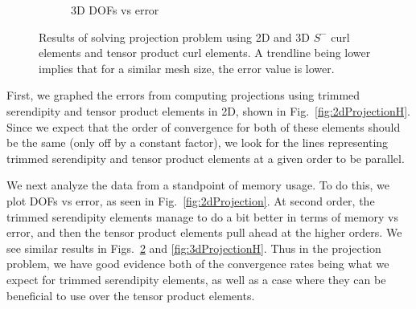 \documentclass[manuscript,screen]{acmart}
\newcommand\josh[1]{\textbf{\textcolor[rgb]{0,.5,1}{[Josh: #1]}}}
\begin{document}
\begin{figure}[h]
\begin{subfigure}[h]{0.5\textwidth}
    \caption{3D DOFs vs error}
    \label{fig:3dProjectionDofs}
  \end{subfigure}
  \caption{Results of solving projection problem using 2D and 3D $S^-$ curl elements and tensor product curl elements.  A trendline being lower implies that for a similar mesh size, the error value is lower.} 
\end{figure}
\newpage

First, we graphed the errors from computing projections using trimmed serendipity and tensor product elements in 2D, shown in Fig.~\ref{fig:2dProjectionH}.  Since we expect that the order of convergence for both of these elements should be the same (only off by a constant factor), we look for the lines representing trimmed serendipity and tensor product elements at a given order to be parallel.
  
We next analyze the data from a standpoint of memory usage.  To do this, we plot DOFs vs error, as seen in Fig.~\ref{fig:2dProjection}. At second order, the trimmed serendipity elements manage to do a bit better in terms of memory vs error, and then the tensor product elements pull ahead at the higher orders. We see similar results in Figs.~\ref{fig:3dProjectionDofs} and \ref{fig:3dProjectionH}.  Thus in the projection problem, we have good evidence both of the convergence rates being what we expect for trimmed serendipity elements, as well as a case where they can be beneficial to use over the tensor product elements.


 
\end{document}
